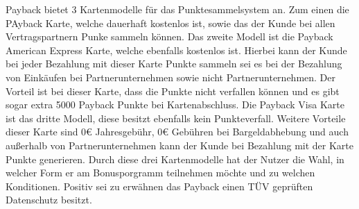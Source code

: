 \noindent Payback bietet 3 Kartenmodelle für das Punktesammelsystem an. Zum einen die PAyback Karte, welche dauerhaft kostenlos ist, sowie das der Kunde bei allen Vertragspartnern Punke sammeln können. Das zweite Modell ist die Payback American Express Karte, welche ebenfalls kostenlos ist. Hierbei kann der Kunde bei jeder Bezahlung mit dieser Karte Punkte sammeln sei es bei der Bezahlung von Einkäufen bei Partnerunternehmen sowie nicht Partnerunternehmen. Der Vorteil ist bei dieser Karte, dass die Punkte nicht verfallen können und es gibt sogar extra 5000 Payback Punkte bei Kartenabschluss. Die Payback Visa Karte ist das dritte Modell, diese besitzt ebenfalls kein Punkteverfall. Weitere Vorteile dieser Karte sind 0€ Jahresgebühr, 0€ Gebühren bei Bargeldabhebung und auch außerhalb von Partnerunternehmen kann der Kunde bei Bezahlung mit der Karte Punkte generieren. 
Durch diese drei Kartenmodelle hat der Nutzer die Wahl, in welcher Form er am Bonusporgramm teilnehmen möchte und zu welchen Konditionen.
Positiv sei zu erwähnen das Payback einen TÜV geprüften Datenschutz besitzt. \cite{Payback_Karten} 